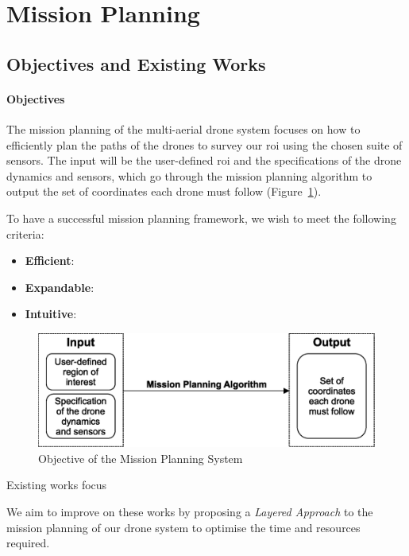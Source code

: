 \newpage
{}
\section{Mission Planning} \label{missionplanning}

\subsection{Objectives and Existing Works}

\paragraph{Objectives}

The mission planning of the multi-aerial drone system focuses on how to efficiently plan the paths of the drones to survey our \gls{roi} using the chosen suite of sensors. The input will be the user-defined \gls{roi} and the specifications of the drone dynamics and sensors, which go through the mission planning algorithm to output the set of coordinates each drone must follow (Figure~\ref{fig:objmsp}).

To have a successful mission planning framework, we wish to meet the following criteria:

\begin{itemize}
    \item \textbf{Efficient}: 
    \item \textbf{Expandable}:
    \item \textbf{Intuitive}:
\end{itemize}

\begin{figure}
    \centering
    \includegraphics[width=0.5\linewidth]{figs/Jihwan/Objective of the Mission Planning System.eps}
    \caption{Objective of the Mission Planning System}
    \label{fig:objmsp}
\end{figure}

Existing works focus 

We aim to improve on these works by proposing a \textit{Layered Approach} to the mission planning of our drone system to optimise the time and resources required.  

